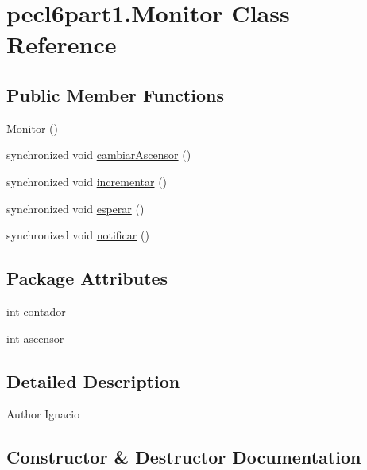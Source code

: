 \hypertarget{classpecl6part1_1_1_monitor}{}\section{pecl6part1.\+Monitor Class Reference}
\label{classpecl6part1_1_1_monitor}
\subsection*{Public Member Functions}
\begin{DoxyCompactItemize}
\item 
\mbox{\hyperlink{classpecl6part1_1_1_monitor_a7726f01af3681c206c3eda082b41a456}{Monitor}} ()
\item 
synchronized void \mbox{\hyperlink{classpecl6part1_1_1_monitor_af73b7d642935a50f59404c7e74e3830a}{cambiar\+Ascensor}} ()
\item 
synchronized void \mbox{\hyperlink{classpecl6part1_1_1_monitor_afd6c7d222a3849b8406f0f20ab7a2302}{incrementar}} ()
\item 
synchronized void \mbox{\hyperlink{classpecl6part1_1_1_monitor_a512e31c5c3891662a9d7dcaa2280afe6}{esperar}} ()
\item 
synchronized void \mbox{\hyperlink{classpecl6part1_1_1_monitor_a0d517f29c1d3a1bcc10a0fc80283a342}{notificar}} ()
\end{DoxyCompactItemize}
\subsection*{Package Attributes}
\begin{DoxyCompactItemize}
\item 
int \mbox{\hyperlink{classpecl6part1_1_1_monitor_aae725b0e0c2cef21ad644a73bc02b777}{contador}}
\item 
int \mbox{\hyperlink{classpecl6part1_1_1_monitor_a6a25fb9f29d59a43156c1c2413d3b5f0}{ascensor}}
\end{DoxyCompactItemize}


\subsection{Detailed Description}
\begin{DoxyAuthor}{Author}
Ignacio 
\end{DoxyAuthor}


\subsection{Constructor \& Destructor Documentation}
\mbox{\label{classpecl6part1_1_1_monitor_a7726f01af3681c206c3eda082b41a456}} 
